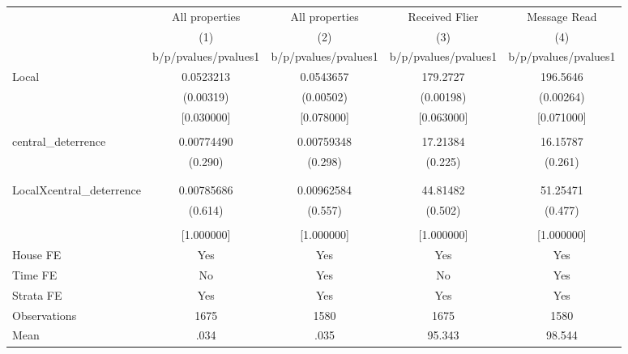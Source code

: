 {
\def\sym#1{\ifmmode^{#1}\else\(^{#1}\)\fi}
\begin{tabular}{l*{4}{c}}
\toprule
                &\multicolumn{1}{c}{All properties}&\multicolumn{1}{c}{All properties}&\multicolumn{1}{c}{Received Flier}&\multicolumn{1}{c}{Message Read}\\
                &\multicolumn{1}{c}{(1)}&\multicolumn{1}{c}{(2)}&\multicolumn{1}{c}{(3)}&\multicolumn{1}{c}{(4)}\\
                &b/p/pvalues/pvalues1&b/p/pvalues/pvalues1&b/p/pvalues/pvalues1&b/p/pvalues/pvalues1\\
\midrule
Local           &0.0523213&0.0543657& 179.2727& 196.5646\\
                &(0.00319)&(0.00502)&(0.00198)&(0.00264)\\
                &[0.030000]&[0.078000]&[0.063000]&[0.071000]\\
                &         &         &         &         \\
central\_deterrence&0.00774490&0.00759348& 17.21384& 16.15787\\
                &  (0.290)&  (0.298)&  (0.225)&  (0.261)\\
                &         &         &         &         \\
                &         &         &         &         \\
LocalXcentral\_deterrence&0.00785686&0.00962584& 44.81482& 51.25471\\
                &  (0.614)&  (0.557)&  (0.502)&  (0.477)\\
                &         &         &         &         \\
                &[1.000000]&[1.000000]&[1.000000]&[1.000000]\\
House FE        &      Yes&      Yes&      Yes&      Yes\\
Time FE         &       No&      Yes&       No&      Yes\\
Strata FE       &      Yes&      Yes&      Yes&      Yes\\
\midrule
Observations    &     1675&     1580&     1675&     1580\\
Mean            &     .034&     .035&   95.343&   98.544\\
\bottomrule
\end{tabular}
}
